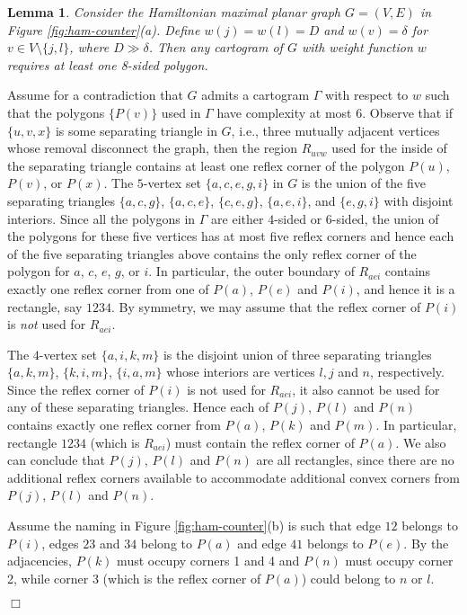\documentclass[11pt]{article}
\newtheorem{lemma}{Lemma}[section]
\newenvironment{proof}{{\bf Proof:} }{\hspace*{\fill}$\Box$\vspace{2mm}}
\begin{document}
\begin{lemma}
\label{lem:ham-counter} Consider the Hamiltonian maximal planar graph $G = (V,E)$ in Figure \ref{fig:ham-counter}(a).
 Define $w(j) = w(l) = D$ and $w(v) = \delta$ for $v \in V \setminus\{j,l\}$, where $D\gg\delta$. Then any cartogram
 of $G$ with weight function $w$ requires at least one 8-sided polygon.
\end{lemma}
\begin{proof}
Assume for a contradiction that $G$ admits a cartogram $\Gamma$ with respect to $w$ such that the polygons $\{P(v)\}$
used in $\Gamma$ have complexity at most 6.
Observe that if $\{u,v,x\}$ is some
 separating triangle in $G$, i.e.,
three mutually adjacent vertices whose removal disconnect the graph,
then the region $R_{uvw}$ used for the inside of the separating triangle contains
at least one reflex corner of the polygon $P(u)$, $P(v)$, or $P(x)$.
 The $5$-vertex set $\{a,c,e,g,i\}$ in $G$ is the union of the five separating triangles
 $\{a,c,g\}$, $\{a,c,e\}$, $\{c,e,g\}$, $\{a,e,i\}$, and $\{e,g,i\}$ with disjoint interiors. Since all the
 polygons in $\Gamma$ are either $4$-sided or $6$-sided,
 the union of
 the polygons for these five vertices has
 at most five reflex corners and hence each of the five separating triangles above contains the only reflex
 corner of the polygon for $a$, $c$, $e$, $g$, or $i$.
In particular, the outer boundary of $R_{aei}$
 contains exactly one reflex corner from one of $P(a)$, $P(e)$ and $P(i)$, and hence it is a rectangle, say
 $1234$.
By symmetry, we may assume that the reflex corner of $P(i)$ is {\em not}
used for $R_{aei}$.

The $4$-vertex set $\{a,i,k,m\}$ is the disjoint union of
three separating triangles $\{a,k,m\}$, $\{k,i,m\}$, $\{i,a,m\}$
whose interiors are vertices $l,j$ and $n$, respectively.
Since the reflex corner of $P(i)$ is not used for $R_{aei}$, it
also cannot be used for any of these separating triangles. Hence each
of $P(j)$, $P(l)$ and $P(n)$ contains exactly one reflex
corner from $P(a)$, $P(k)$ and $P(m)$.  In particular,
rectangle $1234$ (which is $R_{aei}$) must contain the reflex corner
of $P(a)$.   We also can conclude that
$P(j)$, $P(l)$ and $P(n)$ are all rectangles, since there are no
additional reflex corners available to accommodate additional
convex corners from $P(j)$, $P(l)$ and $P(n)$.

Assume the naming in Figure \ref{fig:ham-counter}(b) is such
that edge $12$ belongs to $P(i)$, edges $23$ and $34$ belong to $P(a)$
and edge $41$ belongs to $P(e)$.   By the adjacencies, $P(k)$ must occupy
corners 1 and 4 and $P(n)$ must occupy corner 2, while corner 3 (which
is the reflex corner of $P(a)$) could belong to $n$ or $l$.


\end{proof}
\end{document}
